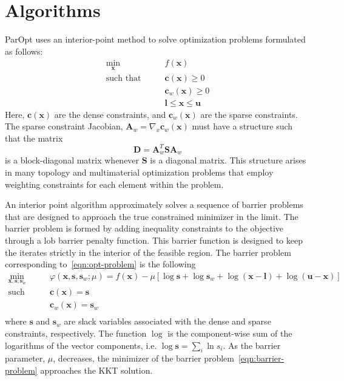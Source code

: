 \documentclass[12pt]{article}
\newcommand{\mb}{\mathbf}
\begin{document}
\section{Algorithms}

ParOpt uses an interior-point method to solve optimization problems formulated as follows:
\begin{equation}
  \label{eqn:opt-problem}
  \begin{aligned}
    \min_{\mb{x}} \qquad & f(\mb{x}) \\
    \text{such that} \qquad 
    & \mb{c}(\mb{x}) \ge 0 \\
    & \mb{c}_{w}(\mb{x}) \ge 0 \\
    & \mb{l} \le \mb{x} \le \mb{u}
  \end{aligned}
\end{equation}
Here, $\mb{c}(\mb{x})$ are the dense constraints, and $\mb{c}_{w}(\mb{x})$ are the sparse constraints. 
The sparse constraint Jacobian, $\mb{A}_{w} = \nabla_{x} \mb{c}_{w}(\mb{x})$ must have a structure such that the matrix
\begin{equation*}
  \mb{D} = \mb{A}_{w}^{T}\mb{S}\mb{A}_{w}
\end{equation*}
is a block-diagonal matrix whenever $\mb{S}$ is a diagonal matrix. 
This structure arises in many topology and multimaterial optimization problems that employ weighting constraints for each element within the problem. 

An interior point algorithm approximately solves a sequence of barrier problems that are designed to approach the true constrained minimizer in the limit.
The barrier problem is formed by adding inequality constraints to the objective through a lob barrier penalty function. 
This barrier function is designed to keep the iterates strictly in the interior of the feasible region. 
The barrier problem corresponding to~\eqref{eqn:opt-problem} is the following
\begin{equation}
  \label{eqn:barrier-problem}
  \begin{aligned}
    \min_{\mb{x}, \mb{s}, \mb{s}_{w}} \qquad &  \varphi(\mb{x}, \mb{s}, \mb{s}_{w}; \mu) = f(\mb{x}) - \mu \left[ \log \mb{s} + \log \mb{s}_{w} + \log (\mb{x} - \mb{l}) + \log (\mb{u} - \mb{x})  \right] \\
    \text{such that} \qquad & \mb{c}(\mb{x}) = \mb{s} \\
    & \mb{c}_{w}(\mb{x}) = \mb{s}_{w} \\
  \end{aligned}
\end{equation}
where $\mb{s}$ and $\mb{s}_{w}$ are slack variables associated with the dense and sparse constraints, respectively. 
The function $\log$ is the component-wise sum of the logarithms of the vector components, i.e. $\log \mb{s} = \sum_{i} \ln s_{i}$.
As the barrier parameter, $\mu$, decreases, the minimizer of the barrier problem~\eqref{eqn:barrier-problem} approaches the KKT solution.
\end{document}
